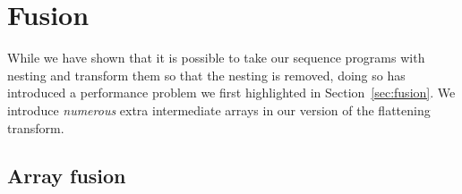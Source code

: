 \section{Fusion}
\label{sec:Optimisation}

While we have shown that it is possible to take our sequence programs with nesting and transform them so that the nesting is removed, doing so has introduced a performance problem we first highlighted in Section~\ref{sec:fusion}. We introduce \emph{numerous} extra intermediate arrays in our version of the flattening transform.






\subsection{Array fusion}

